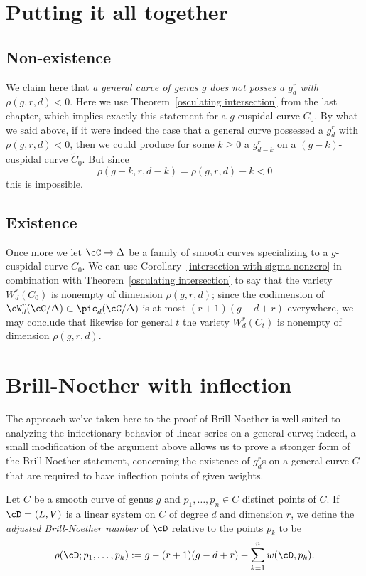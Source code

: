 \section{Putting it all together}

\subsection{Non-existence}

We claim here that \emph{a general curve of genus $g$ does not posses a $g^r_d$ with $\rho(g,r,d) < 0$}.
Here we use Theorem~\ref{osculating intersection} from the last chapter, which implies exactly this statement for a $g$-cuspidal curve $C_0$. By what we said above, if it were indeed the case that a general curve possessed a $g^r_d$ with $\rho(g,r,d) < 0$, then we could produce for some $k \geq 0$ a $g^r_{d-k}$ on a $(g-k)$-cuspidal curve  $\widetilde C_0$. But since
$$
\rho(g-k, r, d-k) = \rho(g,r,d) - k < 0
$$
this is impossible.

\subsection{Existence}

Once more we let $\cC \to \Delta$ be a family of smooth curves specializing to a $g$-cuspidal curve $C_0$. We can use Corollary~\ref{intersection with sigma nonzero} in combination with Theorem~\ref{osculating intersection} to say that the variety $W^r_d(C_0)$ is nonempty of dimension $\rho(g,r,d)$; since the codimension of $\cW^r_d(\cC/\Delta) \subset \pic_d(\cC/\Delta)$ is at most $(r+1)(g-d+r)$ everywhere, we may conclude that likewise for general $t$ the variety $W^r_d(C_t)$ is nonempty of dimension $\rho(g,r,d)$.

\section{Brill-Noether with inflection}

The approach we've taken here to the proof of Brill-Noether is well-suited to analyzing the inflectionary behavior of linear series on a general curve; indeed, a small modification of the argument above allows us to prove a stronger form of the Brill-Noether statement, concerning the existence of $g^r_d$s on a general curve $C$ that are required to
 have inflection points of given weights.

\begin{definition}
Let $C$ be a smooth curve of genus $g$ and $p_1,\dots,p_n \in C$ distinct points of $C$. If $\cD = (L,V)$ is a linear system on $C$ of degree $d$ and dimension $r$, we define the \emph{adjusted Brill-Noether number} of $\cD$ relative to the points $p_k$ to be
$$
\rho(\cD; p_1,\dots,p_k) := g - (r+1)(g-d+r) - \sum_{k=1}^n w(\cD,p_k).
$$
\end{definition}

